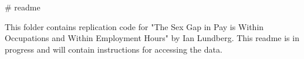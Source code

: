 # readme

This folder contains replication code for "The Sex Gap in Pay is Within Occupations and Within Employment Hours" by Ian Lundberg. This readme is in progress and will contain instructions for accessing the data.